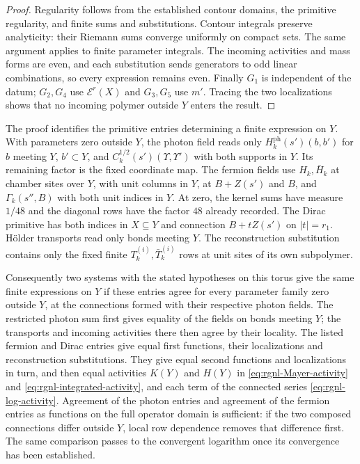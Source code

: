 \begin{proof}
Regularity follows from the established contour domains,
the primitive regularity, and finite sums and substitutions.
Contour integrals preserve analyticity: their Riemann sums
converge uniformly on compact sets. The same argument
applies to finite parameter integrals. The incoming
activities and mass forms are even, and each substitution
sends generators to odd linear combinations, so every
expression remains even.
Finally $G_1$ is independent of the datum; $G_2,G_4$
use $\mathscr E^r(X)$ and $G_3,G_5$ use $m'$.
Tracing the two localizations shows that no incoming
polymer outside $Y$ enters the result.
\end{proof}

The proof identifies the primitive entries determining a
finite expression on $Y$. With parameters zero outside $Y$,
the photon field reads only
$H_k^{\mathrm{ph}}(s')(b,b')$ for $b$ meeting $Y$,
$b'\subset Y$, and
$C_k^{1/2}(s')(\Upsilon,\Upsilon')$ with both supports
in $Y$. Its remaining factor is the fixed coordinate map.
The fermion fields use $H_k,\bar H_k$ at chamber sites
over $Y$, with unit columns in $Y$, at $B+Z(s')$ and
$B$, and $\Gamma_k(s'',B)$ with both unit indices in $Y$.
At zero, the kernel sums have measure $1/48$ and the
diagonal rows have the factor $48$ already recorded.
The Dirac primitive has both indices in $X\subseteq Y$
and connection $B+tZ(s')$ on $|t|=r_1$.
H\"older transports read only bonds meeting $Y$.
The reconstruction substitution contains only the fixed
finite $T_k^{(i)},\bar T_k^{(i)}$ rows at unit sites of its
own subpolymer.

Consequently two systems with the stated hypotheses on this torus give the
same finite expressions on $Y$ if these entries agree
for every parameter family zero outside $Y$, at the
connections formed with their respective photon fields.
The restricted photon sum first gives equality of the
fields on bonds meeting $Y$; the transports and incoming
activities there then agree by their locality.
The listed fermion and Dirac entries give equal first
functions, their localizations and reconstruction
substitutions. They give equal second functions and
localizations in turn, and then equal activities $K(Y)$ and
$H(Y)$ in \eqref{eq:rgnl-Mayer-activity} and
\eqref{eq:rgnl-integrated-activity}, and each term of the
connected series \eqref{eq:rgnl-log-activity}.
Agreement of the photon
entries and agreement of the fermion entries as functions
on the full operator domain is sufficient: if the two
composed connections differ outside $Y$, local row
dependence removes that difference first.
The same comparison passes to the convergent logarithm
once its convergence has been established.

